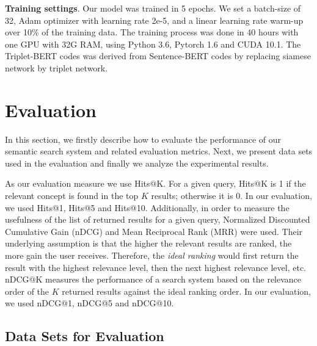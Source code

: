 \documentclass[preprint,12pt]{elsarticle}
\begin{document}
\textbf{Training settings}. Our model was trained in 5 epochs. We set a batch-size of 32, Adam optimizer with learning rate 2e-5, and a linear learning rate warm-up over 10\% of the training data. The training process was done in 40 hours with one GPU with 32G RAM, using Python 3.6, Pytorch 1.6 and CUDA 10.1. The Triplet-BERT codes was derived from Sentence-BERT \cite{Reimers2019} codes by replacing siamese network by triplet network.

\section*{Evaluation}
\label{sec:Evaluation}

In this section, we firstly describe how to evaluate the performance of our semantic search system and related evaluation metrics. Next, we present data sets used in the evaluation and finally we analyze the experimental results.

As our evaluation measure we use Hits@K. For a given query, Hits@K is 1 if the relevant concept is found in the top $K$ results; otherwise it is 0. In our evaluation, we used Hits@1, Hits@5 and Hits@10. Additionally, in order to measure the usefulness of the list of returned results for a given query, Normalized Discounted Cumulative Gain (nDCG) and Mean Reciprocal Rank (MRR) were used. Their underlying assumption is that the higher the relevant results are ranked, the more gain the user receives. Therefore, the \textit{ideal ranking} would first return the result with the highest relevance level, then the next highest relevance level, etc. nDCG@K measures the performance of a search system based on the relevance order of the $K$ returned results against the ideal ranking order. In our evaluation, we used nDCG@1, nDCG@5 and nDCG@10.

\subsection*{Data Sets for Evaluation}
\label{sec:DatasetEvaluation}
\end{document}
